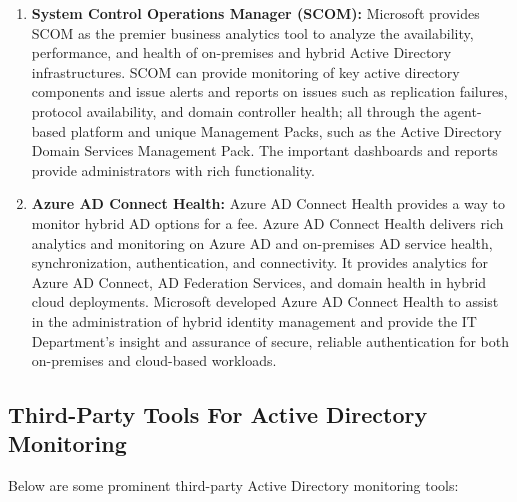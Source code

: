 \begin{enumerate}
    \item \textbf{System Control Operations Manager (SCOM):} Microsoft provides SCOM as the premier business analytics tool to analyze the availability, performance, and health of on-premises and hybrid Active Directory infrastructures. SCOM can provide monitoring of key active directory components and issue alerts and reports on issues such as replication failures, protocol availability, and domain controller health; all through the agent-based platform and unique Management Packs, such as the Active Directory Domain Services Management Pack. The important dashboards and reports provide administrators with rich functionality.
    \item \textbf{Azure AD Connect Health: }Azure AD Connect Health provides a way to monitor hybrid AD options for a fee. Azure AD Connect Health delivers rich analytics and monitoring on Azure AD and on-premises AD service health, synchronization, authentication, and connectivity. It provides analytics for Azure AD Connect, AD Federation Services, and domain health in hybrid cloud deployments. Microsoft developed Azure AD Connect Health to assist in the administration of hybrid identity management and provide the IT Department’s insight and assurance of secure, reliable authentication for both on-premises and cloud-based workloads.
\end{enumerate}

\subsection{\textbf{Third-Party Tools For Active Directory Monitoring}}

Below are some prominent third-party Active Directory monitoring tools:

